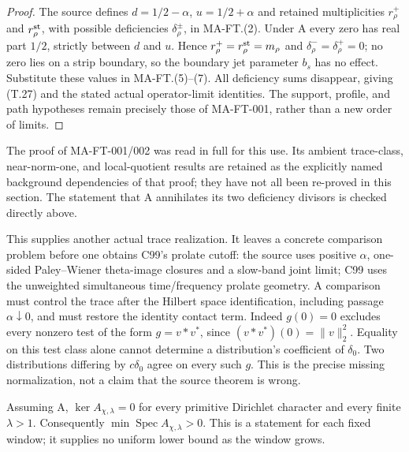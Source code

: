 \begin{proof}
The source defines \(d=1/2-\alpha\), \(u=1/2+\alpha\)
and retained multiplicities \(r_\rho^+\) and
\(r_\rho^{\rm st}\), with possible deficiencies
\(\delta_\rho^\pm\), in MA-FT.(2).
Under A every zero has real part \(1/2\), strictly
between \(d\) and \(u\). Hence
\(r_\rho^+=r_\rho^{\rm st}=m_\rho\) and
\(\delta_\rho^-=\delta_\rho^+=0\); no zero lies
on a strip boundary, so the boundary jet
parameter \(b_s\) has no effect.
Substitute these values in MA-FT.(5)--(7).
All deficiency sums disappear, giving (T.27)
and the stated actual operator-limit
identities. The support, profile, and
path hypotheses remain precisely those
of MA-FT-001, rather than a new order
of limits.
\end{proof}

The proof of MA-FT-001/002 was read in full
for this use. Its ambient trace-class,
near-norm-one, and local-quotient results
are retained as the explicitly named
background dependencies of that proof;
they have not all been re-proved in
this section. The statement that A
annihilates its two deficiency divisors
is checked directly above.

This supplies another actual trace realization.
It leaves a concrete comparison problem before
one obtains C99's prolate cutoff: the source
uses positive \(\alpha\), one-sided
Paley--Wiener theta-image closures and
a slow-band joint limit; C99 uses the
unweighted simultaneous time/frequency
prolate geometry. A comparison must
control the trace after the Hilbert
space identification, including passage
\(\alpha\downarrow0\), and must restore
the identity contact term. Indeed
\(g(0)=0\) excludes every nonzero test
of the form \(g=v*v^*\), since
\((v*v^*)(0)=\|v\|_2^2\).
Equality on this test class alone cannot
determine a distribution's coefficient
of \(\delta_0\). Two distributions
differing by \(c\delta_0\) agree on
every such \(g\). This is the precise
missing normalization, not a claim
that the source theorem is wrong.

\begin{corollary}
\label{AC-T13}
Assuming A, \(\ker A_{\chi,\lambda}=0\) for
every primitive Dirichlet character and every
finite \(\lambda>1\). Consequently
\(\min\operatorname{Spec}A_{\chi,\lambda}>0\).
This is a statement for each fixed window;
it supplies no uniform lower bound as the
window grows.
\end{corollary}

